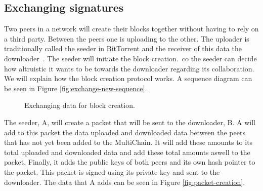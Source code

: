 \subsection{Exchanging signatures}
Two peers in a network will create their blocks together without having to rely on a third party.
Between the peers one is uploading to the other.
The uploader is traditionally called the seeder in BitTorrent and the receiver of this data the downloader~\cite{Cohen-bittorrent}.
The seeder will initiate the block creation.\,
co the seeder can decide how altruistic it wants to be towards the downloader regarding its collaboration.
We will explain how the block creation protocol works.
A sequence diagram can be seen in Figure \ref{fig:exchange-new-sequence}.

\begin{figure}[tpb]
\centering
{}

\caption{Exchanging data for block creation.}
\label{fig:block-creation-new}
\end{figure}

The seeder, A, will create a packet that will be sent to the downloader, B.
A will add to this packet the data uploaded and downloaded data between the peers
that has not yet been added to the MultiChain.
It will add these amounts to its total uploaded and downloaded data
and add these total amounts aswell to the packet.
Finally, it adds the public keys of both peers and its own hash pointer to the packet.
This packet is signed using its private key and sent to the downloader.
The data that A adds can be seen in Figure \ref{fig:packet-creation}.


